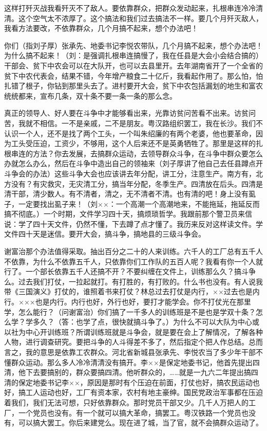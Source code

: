 这样打歼灭战我看歼灭不了敌人。要依靠群众，把群众发动起来，扎根串连冷冷清清。这个空气太不浓厚了。这个搞法和我们过去搞法不一样。要几个月歼灭敌人，我看方法要改，不依靠群众，几个月搞不起来，想个办法吧！

你们（指刘子厚）张承先、地委书记李悦农带队，几个月搞不起来，想个办法吧！为什么搞不起来！（刘：是强调扎根串连搞慢了，我在任县是大会小会结合搞的）干部会、贫下中农会可以在大队开，也可以去县里开。去年湖南省开了一个全省的贫下中农代表会，结果不错，今年增产粮食二十亿斤，我看起作用了。那么怕，怕扎错了根子，你钻到那里头去了。进村要开大会，贫下中农包括漏划的地生和富农统统都来，宣布几条，双十条不要一条一条的那么念。

真正的领导人、好人要在斗争中才能够看出来，光靠访贫问苦看不出来。访贫问苦，我就不相信。一不是亲戚，二不是朋友。粤汉路组织罢工，我在长沙。我们不认识一个人，还不是找了两个工头，一个叫朱绍廉的有两个老婆，他也要革命，因为工头受压迫，工资少，不够用，这个人后来还不是英勇牺牲了。那里是这样的扎根串连的方法？你去发展，去搞群众运动，去领导群众斗争，在斗争中群众要怎么办就怎么办么，然后在斗争中造出自己的领袖来（刘子厚讲了他自己去任县蹲点开斗争会的办法）这些斗争大会也应该讲去年分配，讲工分，注意生产。南方有，北方没有？有灾救灾，无灾清工分，搞当年分配，冬季生产。四清放在后头。四清是清干部，清少数人。有不清者，清之，无不清者不清。也有清的吧！身上没有虱子，一定要找出虱子来！（刘××：一个高潮一个高潮地来，不能拖延，拖延反而搞不彻底。）一个时期，文件学习四十天，搞烦琐哲学。我跟前那个警卫员来信说：学了四十天文件，仍然不懂，下去蹲了点才懂了。我历来反对这样读文件。学文件四十天是迷信。要开大会，搞斗争，搞地县的三级斗争会。

谢富治那个办法值得采取。抽出百分之二十的人来训练。六千人的工厂总有五千人不依靠，为什么不依靠五千人，只依靠你们工作队的五百人呢？我看有你一个人就行了。一个部长依靠五千人还搞不开？不要纠缠在文件上，训练那么久？搞斗争么。过去我们打仗，一拉起就打。有打胜的，有打败的。什么书也没有。有人说我带《三国演义》打仗的，谁照着书来打仗？林总过去打仗是内行，××过去也是内行。×××也是内行。内行也好，外行也好，要打才能学会。你不打仗光在那里学，怎么能行？（问谢富治）你们搞了一千多人的训练班是不是也是学双十条？怎么学？学多久？（答：也学了点，很快就搞斗争了。）为什么不可以大队为中心或以社为中心开训练班？所谓训练班就是斗争会，就是要在会上了解情况，了解各种人物，进行调查研究。要把斗争的人斗得差不多了，然后指定个把人作总结。总而言之，我的意思是依靠工农群众。河北省新城县张承先、李悦农当了多少年干部不懂群众运动。那么多人冷冷清清没有搞开。李××是保定地委书记，他首先提出四清，他下去要搞别的，群众要搞四清。他听群众的，……就是一九六二年提出搞四清的保定地委书记李××，原因是那时有个压迫在前面，打仗也好，搞农民运动也好，搞工人运动也好，工厂有资本家，农村有地主豪绅。国民党政治军事都在压迫着我们，我们无法可想，只好依靠群众。那时党员干部又少。几千人万把人的工厂，一个党员也没有。有一个就可以搞大革命，搞罢工。粤汉铁路一个党员也没有，可以搞大罢工。你后来建党么。现在进了城，当了官，就不会搞群众运动了。

